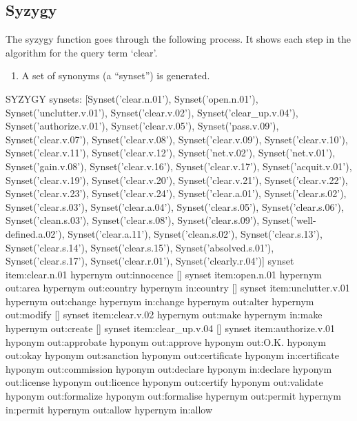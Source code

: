 {\subsection{Syzygy}



The syzygy function goes through the following process.
It shows each step in the algorithm for the query term `clear'.
\begin{enumerate}
  \item A set of synonyms (a ``synset'') is generated.
\end{enumerate}

\begin{draft}
SYZYGY
synsets:
[Synset('clear.n.01'), Synset('open.n.01'), Synset('unclutter.v.01'), Synset('clear.v.02'), Synset('clear\_up.v.04'), Synset('authorize.v.01'), Synset('clear.v.05'), Synset('pass.v.09'), Synset('clear.v.07'), Synset('clear.v.08'), Synset('clear.v.09'), Synset('clear.v.10'), Synset('clear.v.11'), Synset('clear.v.12'), Synset('net.v.02'), Synset('net.v.01'), Synset('gain.v.08'), Synset('clear.v.16'), Synset('clear.v.17'), Synset('acquit.v.01'), Synset('clear.v.19'), Synset('clear.v.20'), Synset('clear.v.21'), Synset('clear.v.22'), Synset('clear.v.23'), Synset('clear.v.24'), Synset('clear.a.01'), Synset('clear.s.02'), Synset('clear.s.03'), Synset('clear.a.04'), Synset('clear.s.05'), Synset('clear.s.06'), Synset('clean.s.03'), Synset('clear.s.08'), Synset('clear.s.09'), Synset('well-defined.a.02'), Synset('clear.a.11'), Synset('clean.s.02'), Synset('clear.s.13'), Synset('clear.s.14'), Synset('clear.s.15'), Synset('absolved.s.01'), Synset('clear.s.17'), Synset('clear.r.01'), Synset('clearly.r.04')]
synset item:clear.n.01
hypernym out:innocence
[]
synset item:open.n.01
hypernym out:area
hypernym out:country
hypernym in:country
[]
synset item:unclutter.v.01
hypernym out:change
hypernym in:change
hypernym out:alter
hypernym out:modify
[]
synset item:clear.v.02
hypernym out:make
hypernym in:make
hypernym out:create
[]
synset item:clear\_up.v.04
[]
synset item:authorize.v.01
hyponym out:approbate
hyponym out:approve
hyponym out:O.K.
hyponym out:okay
hyponym out:sanction
hyponym out:certificate
hyponym in:certificate
hyponym out:commission
hyponym out:declare
hyponym in:declare
hyponym out:license
hyponym out:licence
hyponym out:certify
hyponym out:validate
hyponym out:formalize
hyponym out:formalise
hypernym out:permit
hypernym in:permit
hypernym out:allow
hypernym in:allow

\end{draft}}
